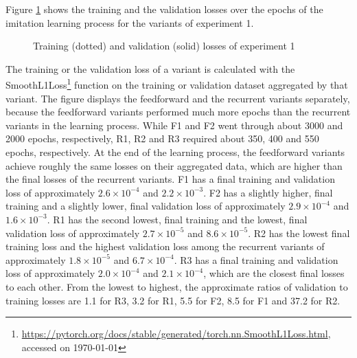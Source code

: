 Figure \ref{fig:e1_learn} shows the 
training and the validation losses
over the epochs of the imitation learning process 
for the variants of experiment 1.
\begin{figure}
    \centering
    \hspace*{0cm}
    \par
    \caption[
        Training and validation losses of experiment 1
    ]{
        Training (dotted) and validation (solid) losses of experiment 1
        \label{fig:e1_learn}
    }
\end{figure}
The training or the validation loss of a variant is calculated with the SmoothL1Loss\footnote{
    \url{https://pytorch.org/docs/stable/generated/torch.nn.SmoothL1Loss.html}, accessed on \today
}
function on the training or validation dataset aggregated by that variant.
The figure displays the feedforward and the recurrent variants separately,
because the feedforward variants performed much more epochs than the recurrent variants in the learning process.
While F1 and F2 went through about 3000 and 2000 epochs, respectively,
R1, R2 and R3 required about 350, 400 and 550 epochs, respectively.
At the end of the learning process,
the feedforward variants achieve roughly the same losses on their aggregated data,
which are higher than the final losses of the recurrent variants.
F1 has a final training and validation loss of 
approximately $2.6\times 10^{-4}$ and $2.2\times 10^{-3}$.
F2 has a slightly higher, final training and a slightly lower, final validation loss of approximately
$2.9\times 10^{-4}$ and $1.6\times 10^{-3}$.
R1 has the second lowest, final training and the lowest, final validation
loss of approximately $2.7\times 10^{-5}$ and $8.6\times 10^{-5}$.
R2 has the lowest final training loss and 
the highest validation loss among the recurrent variants 
of approximately $1.8\times 10^{-5}$ and $6.7\times 10^{-4}$.
R3 has a final training and validation loss of approximately $2.0\times 10^{-4}$ and $2.1\times 10^{-4}$,
which are the closest final losses to each other.
From the lowest to highest,
the approximate ratios of validation to training losses are 
1.1 for R3,
3.2 for R1,
5.5 for F2,
8.5 for F1 
and 37.2 for R2.


